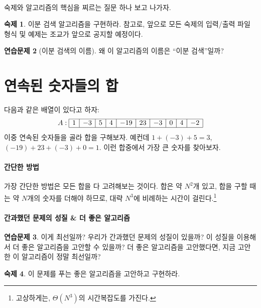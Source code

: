 \documentclass{oblivoir}
\theoremstyle{definition}
\newtheorem{exercise}{연습문제}
\newtheorem{homework}[exercise]{숙제}
\begin{document}
\paragraph{} 숙제와 알고리즘의 핵심을 찌르는 질문 하나 보고 나가자.

\begin{homework}
  이분 검색 알고리즘을 구현하라.  참고로, 앞으로 모든 숙제의 입력/출력
  파일 형식 및 예제는 조교가 앞으로 공지할 예정이다.
\end{homework}

\begin{exercise}[이분 검색의 이름]
  왜 이 알고리즘의 이름은 ``이분 검색''일까?
\end{exercise}

\section{연속된 숫자들의 합}

다음과 같은 배열이 있다고 하자:
\[
A: \begin{array}{|c|c|c|c|c|c|c|c|c|c|}
\hline
1 & -3 & 5 & 4 & -19 & 23 & -3 & 0 & 4 & -2 \\
\hline
\end{array}
\]
이중 연속된 숫자들을 골라 합을 구해보자.  예컨데 $1+(-3)+5=3$,
$(-19)+23+(-3)+0=1$.  이런 합중에서 가장 큰 숫자를 찾아보자.

\paragraph{간단한 방법}
가장 간단한 방법은 모든 합을 다 고려해보는 것이다. 합은 약 $N^2$개
있고, 합을 구할 때는 약 $N$개의 숫자를 더해야 하므로, 대략 $N^3$에
비례하는 시간이 걸린다.\footnote{고상하게는, $\Theta(N^3)$의
  시간복잡도를 가진다.}

\paragraph{간과했던 문제의 성질 \& 더 좋은 알고리즘}

\begin{exercise}
  이게 최선일까? 우리가 간과했던 문제의 성질이 있을까? 이 성질을
  이용해서 더 좋은 알고리즘을 고안할 수 있을까? 더 좋은 알고리즘을
  고안했다면, 지금 고안한 이 알고리즘이 정말 최선일까?
\end{exercise}

\begin{homework}
  이 문제를 푸는 좋은 알고리즘을 고안하고 구현하라.
\end{homework}
\end{document}

